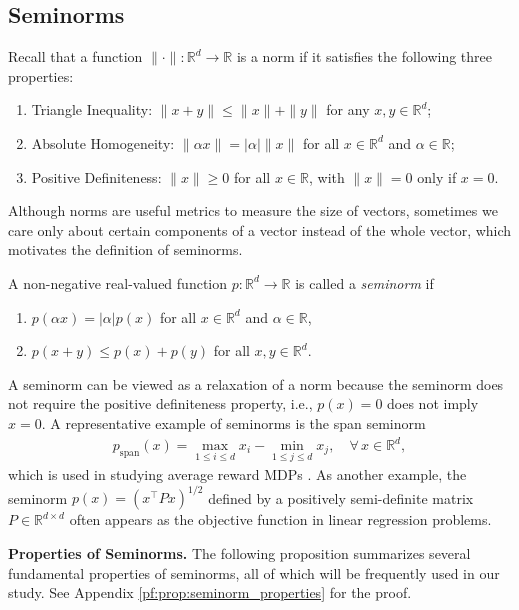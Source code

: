 \documentclass[11 pt]{article}
\begin{document}
	\subsection{Seminorms}
	\label{subsec: seminorm}
	Recall that a function $\|\cdot\| : \mathbb{R}^d \to \mathbb{R}$ is a norm if it satisfies the following three properties:
	\begin{enumerate}[(1)]
		\item Triangle Inequality: $\|x + y\| \leq \|x\| + \|y\|$ for any $x,y\in\mathbb{R}^d$; 
		\item Absolute Homogeneity: $\|\alpha x\| = |\alpha| \|x\|$ for all $x\in\mathbb{R}^d$ and $\alpha\in\mathbb{R}$; 
		\item Positive Definiteness: $\|x\| \geq 0$ for all $x\in\mathbb{R}$, with $\|x\| = 0$ only if $x = 0$.
	\end{enumerate}
	Although norms are useful metrics to measure the size of vectors, sometimes we care only about certain components of a vector instead of the whole vector, which motivates the definition of seminorms.
	
	\begin{definition}
		\label{def:seminorm}
		A non-negative real-valued function $p: \mathbb{R}^d  \to \mathbb{R}$ is called a \textit{seminorm} if 
		\begin{enumerate}[(1)]
			\item  $p(\alpha x) = | \alpha | p(x)$ for all $x \in \mathbb{R}^d$ and $\alpha \in \mathbb{R}$,
			\item $p(x+y) \leq p(x) + p(y)$ for all $x, y \in \mathbb{R}^d$.
		\end{enumerate} 
	\end{definition}
	
	A seminorm can be viewed as a relaxation of a norm because the seminorm does not require the positive definiteness property, i.e., $p(x) = 0$ does not imply $x = 0$. A representative example of seminorms is the span seminorm 
	\begin{align*}
		p_\text{span}(x)= \max_{1\leq i\leq d} x_i - \min_{1\leq j\leq d} x_j,\quad \forall\,x \in \mathbb{R}^d,
	\end{align*}
	which is used in studying average reward MDPs \cite{puterman2014markov}. As another example, the seminorm $p(x)=(x^\top Px)^{1/2}$ defined by a positively semi-definite matrix $P\in\mathbb{R}^{d\times d}$ often appears as the objective function in linear regression problems.
	
	
	\vspace{3 mm}
	\noindent\textbf{Properties of Seminorms.} The following proposition summarizes several fundamental properties of seminorms, all of which will be frequently used in our study. See Appendix \ref{pf:prop:seminorm_properties} for the proof.
	
\end{document}
